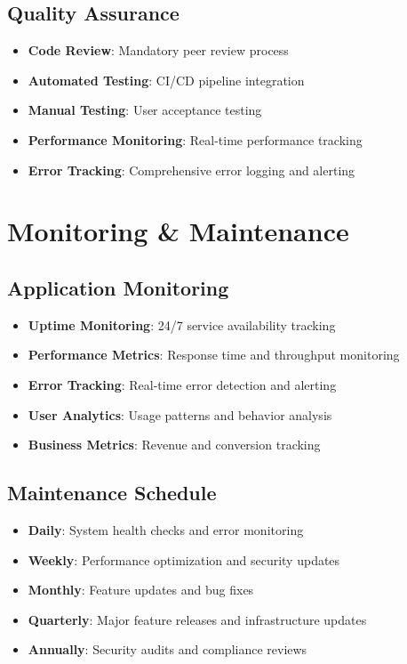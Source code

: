 \documentclass[11pt,a4paper]{article}
\begin{document}
\subsection{Quality Assurance}
\begin{itemize}
    \item \textbf{Code Review}: Mandatory peer review process
    \item \textbf{Automated Testing}: CI/CD pipeline integration
    \item \textbf{Manual Testing}: User acceptance testing
    \item \textbf{Performance Monitoring}: Real-time performance tracking
    \item \textbf{Error Tracking}: Comprehensive error logging and alerting
\end{itemize}

\section{Monitoring \& Maintenance}

\subsection{Application Monitoring}
\begin{itemize}
    \item \textbf{Uptime Monitoring}: 24/7 service availability tracking
    \item \textbf{Performance Metrics}: Response time and throughput monitoring
    \item \textbf{Error Tracking}: Real-time error detection and alerting
    \item \textbf{User Analytics}: Usage patterns and behavior analysis
    \item \textbf{Business Metrics}: Revenue and conversion tracking
\end{itemize}

\subsection{Maintenance Schedule}
\begin{itemize}
    \item \textbf{Daily}: System health checks and error monitoring
    \item \textbf{Weekly}: Performance optimization and security updates
    \item \textbf{Monthly}: Feature updates and bug fixes
    \item \textbf{Quarterly}: Major feature releases and infrastructure updates
    \item \textbf{Annually}: Security audits and compliance reviews
\end{itemize}
\end{document}
